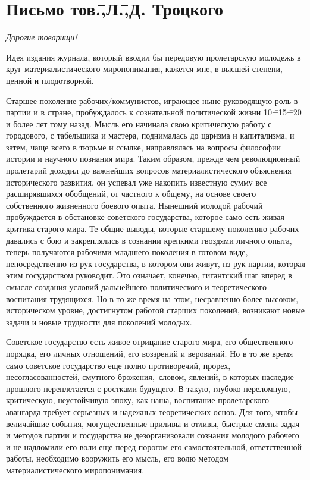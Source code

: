 \newpage
\section*{Письмо тов.\=,Л.\=,Д. Троцкого}
\label{sec:1}

\emph{Дорогие товарищи!}

Идея издания журнала, который вводил бы передовую пролетарскую молодежь в круг материалистического миропонимания, кажется мне, в высшей степени, ценной и плодотворной.

Старшее поколение рабочих\-/коммунистов, играющее ныне руководящую роль в партии и в стране, пробуждалось к сознательной политической жизни 10\==15\==20 и более лет тому назад. Мысль его начинала свою критическую работу с городового, с табельщика и мастера, поднималась до царизма и капитализма, и затем, чаще всего в тюрьме и ссылке, направлялась на вопросы философии истории и научного познания мира. Таким образом, прежде чем революционный пролетарий доходил до важнейших вопросов материалистического объяснения исторического развития, он успевал уже накопить известную сумму все расширявшихся обобщений, от частного к общему, на основе своего собственного жизненного боевого опыта. Нынешний молодой рабочий пробуждается в обстановке советского государства, которое само есть живая критика старого мира. Те общие выводы, которые старшему поколению рабочих давались с бою и закреплялись в сознании крепкими гвоздями личного опыта, теперь получаются рабочими младшего поколения в готовом виде, непосредственно из рук государства, в котором они живут, нз рук партии, которая этим государством руководит. Это означает, конечно, гигантский шаг вперед в смысле создания условий дальнейшего политического и теоретического воспитания трудящихся. Но в то же время на этом, несравненно более высоком, историческом уровне, достигнутом работой старших поколений, возникают новые задачи и новые трудности для поколений молодых.

Советское государство есть живое отрицание старого мира, его общественного порядка, его личных отношений, его воззрений и верований. Но в то же время само советское государство еще полно противоречий, прорех, несогласованностей, смутного брожения,\---словом, явлений, в которых наследие прошлого переплетается с ростками будущего. В такую, глубоко переломную, критическую, неустойчивую эпоху, как наша, воспитание пролетарского авангарда требует серьезных и надежных теоретических основ. Для того, чтобы величайшие события, могущественные приливы и отливы, быстрые смены задач и методов партии и государства не дезорганизовали сознания молодого рабочего и не надломили его воли еще перед порогом его самостоятельной, ответственной работы, необходимо вооружить его мысль, его волю методом материалистического миропонимания.

